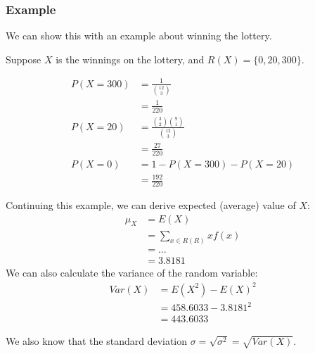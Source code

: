                     \subsubsection{Example} %
                    \label{ssub:example}
                        We can show this with an example about winning the lottery.

                        Suppose $X$ is the winnings on the lottery, and $R(X) = \{ 0, 20, 300 \}$.

                        \begin{align*}
                            P(X = 300) &= \frac{1}{ {12 \choose 3}} \\
                            &= \frac{1}{220} \\
                            P(X = 20) &= \frac{{3 \choose 2} {9 \choose 1}}{{12 \choose 3}} \\
                            &= \frac{27}{220} \\
                            P(X = 0) &= 1 - P(X = 300) - P(X = 20) \\
                            &= \frac{192}{220}
                        \end{align*}

                        Continuing this example, we can derive expected (average) value of $X$:
                        \begin{align*}
                            \mu_X &= E(X) \\
                            &= \sum_{x \in R(R)} x f(x) \\
                            &= \ldots \\
                            &= 3.8181
                        \end{align*}
                        We can also calculate the variance of the random variable:
                        \begin{align*}
                            Var(X) &= E(X^2) - E(X)^2 \\
                            &= 458.6033- 3.8181^2 \\
                            &= 443.6033
                        \end{align*}

                        We also know that the standard deviation $\sigma = \sqrt{\sigma^2} = \sqrt{Var(X)}$.

